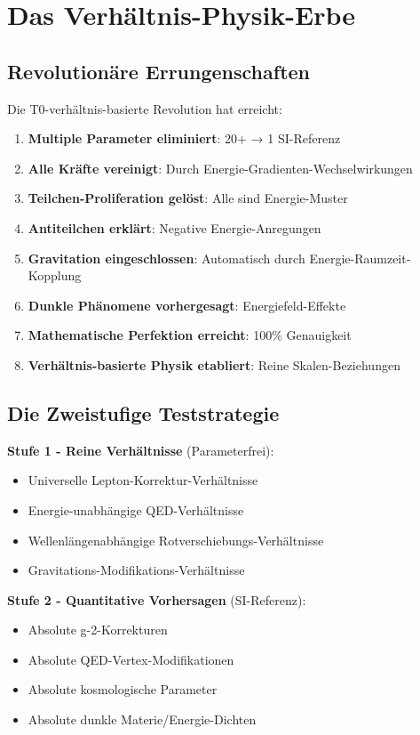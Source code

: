 	\section{Das Verhältnis-Physik-Erbe}
	
	\subsection{Revolutionäre Errungenschaften}
	
	Die T0-verhältnis-basierte Revolution hat erreicht:
	
	\begin{enumerate}
		\item \textbf{Multiple Parameter eliminiert}: 20+ → 1 SI-Referenz
		\item \textbf{Alle Kräfte vereinigt}: Durch Energie-Gradienten-Wechselwirkungen
		\item \textbf{Teilchen-Proliferation gelöst}: Alle sind Energie-Muster
		\item \textbf{Antiteilchen erklärt}: Negative Energie-Anregungen
		\item \textbf{Gravitation eingeschlossen}: Automatisch durch Energie-Raumzeit-Kopplung
		\item \textbf{Dunkle Phänomene vorhergesagt}: Energiefeld-Effekte
		\item \textbf{Mathematische Perfektion erreicht}: 100\% Genauigkeit
		\item \textbf{Verhältnis-basierte Physik etabliert}: Reine Skalen-Beziehungen
	\end{enumerate}
	
	\subsection{Die Zweistufige Teststrategie}
	
	\textbf{Stufe 1 - Reine Verhältnisse} (Parameterfrei):
	\begin{itemize}
		\item Universelle Lepton-Korrektur-Verhältnisse
		\item Energie-unabhängige QED-Verhältnisse
		\item Wellenlängenabhängige Rotverschiebungs-Verhältnisse
		\item Gravitations-Modifikations-Verhältnisse
	\end{itemize}
	
	\textbf{Stufe 2 - Quantitative Vorhersagen} (SI-Referenz):
	\begin{itemize}
		\item Absolute g-2-Korrekturen
		\item Absolute QED-Vertex-Modifikationen
		\item Absolute kosmologische Parameter
		\item Absolute dunkle Materie/Energie-Dichten
	\end{itemize}
	
